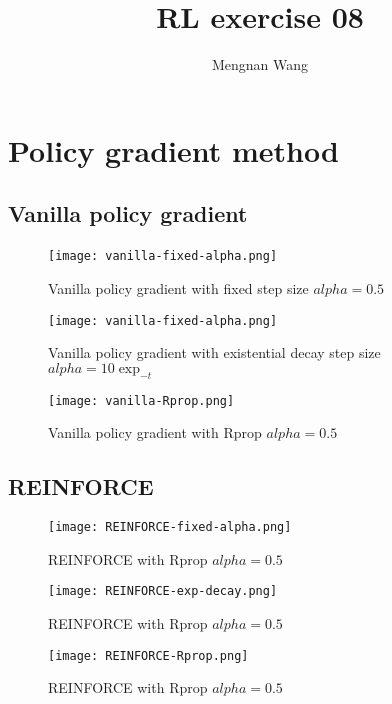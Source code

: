 \documentclass[]{article}
\title{RL exercise 08 }
\author{Mengnan Wang}
\begin{document}
\maketitle

\section{Policy gradient method}
\subsection{Vanilla policy gradient}
\paragraph{}
\begin{figure}[!htb]
	\centering
	\texttt{[image: vanilla-fixed-alpha.png]}
	\caption{\label{fig:vanilla-fixed-alpha}Vanilla policy gradient with fixed step size $alpha=0.5$}
	\end{figure}
	\begin{figure}[!htb]
		\centering
		\texttt{[image: vanilla-fixed-alpha.png]}
		\caption{\label{fig:vanilla-exp-decay}Vanilla policy gradient with existential decay step size $alpha=10\exp_{-t}$}
	\end{figure}
	\begin{figure}[!htb]
		\centering
		\texttt{[image: vanilla-Rprop.png]}
		\caption{\label{fig:vanilla-Rprop}Vanilla policy gradient with Rprop $alpha=0.5$}
	\end{figure}
	
\subsection{REINFORCE}
\begin{figure}[!htb]
	\centering
	\texttt{[image: REINFORCE-fixed-alpha.png]}
	\caption{\label{fig:REINFORCE-fixed-alpha}REINFORCE with Rprop $alpha=0.5$}
\end{figure}
\begin{figure}[!htb]
	\centering
	\texttt{[image: REINFORCE-exp-decay.png]}
	\caption{\label{fig:REINFORCE-exp-decay}REINFORCE with Rprop $alpha=0.5$}
\end{figure}
\begin{figure}[!htb]
	\centering
	\texttt{[image: REINFORCE-Rprop.png]}
	\caption{\label{fig:REINFORCE-Rprop}REINFORCE with Rprop $alpha=0.5$}
\end{figure}
\end{document}
